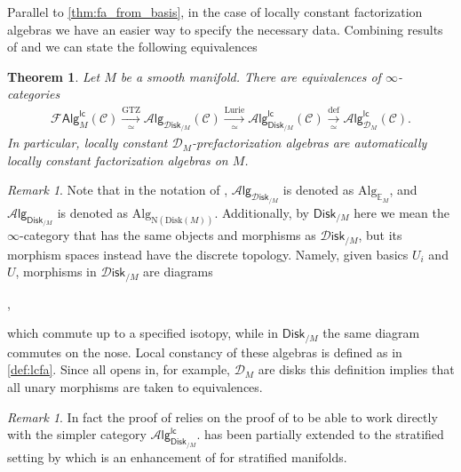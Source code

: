 \documentclass[12pt,a4paper]{article}
\newcounter{counter} \numberwithin{counter}{section}
\theoremstyle{definition}
\theoremstyle{plain}
\newtheorem{theorem}[counter]{Theorem}
\theoremstyle{remark}
\newtheorem{remark}[counter]{Remark}
\newcommand{\catC}{\mathscr{C}}
\newcommand{\lcfa}{\mathscr{F} \mathsf{Alg}^{\mathsf{lc}}}
\newcommand{\disk}{\mathscr{D} \mathsf{isk}}
\newcommand{\alg}[1]{\mathscr{A} \mathsf{lg}_{#1}}
\newcommand{\lcalg}[1]{\mathscr{A} \mathsf{lg}^{\mathsf{lc}}_{#1}}
\begin{document}
Parallel to \cref{thm:fa_from_basis}, in the case of locally constant factorization algebras we have an easier way to specify the necessary data. Combining results of \cite[thm.6]{gtz2014} and \cite[thm.5.4.5.9]{lurie_ha} we can state the following equivalences
%
\begin{theorem}\label{thm:smooth_lcfa_equivalences}
    Let $M$ be a smooth manifold. There are equivalences of $\infty$-categories
    \begin{align}
        \lcfa_M (\catC) \xrightarrow[\simeq]{\mathrm{GTZ}} \alg{\disk_{/M}} (\catC) \xrightarrow[\simeq]{\mathrm{Lurie}} \lcalg{\mathsf{Disk}_{/M}} (\catC) \xrightarrow[\simeq]{\mathrm{def}} \lcalg{\mathscr{D}_M} (\catC).
    \end{align}
    In particular, locally constant $\mathscr{D}_M$-prefactorization algebras are automatically locally constant factorization algebras on $M$.
\end{theorem}

\begin{remark}
    Note that in the notation of \cite{lurie_ha}, $\alg{\disk_{/M}}$ is denoted as $\mathrm{Alg}_{\mathbb{E}_M}$, and $\alg{\mathsf{Disk}_{/M}}$ is denoted as $\mathrm{Alg}_{\mathrm{N}(\mathrm{Disk}(M))}$. Additionally, by $\mathsf{Disk}_{/M}$ here we mean the $\infty$-category that has the same objects and morphisms as $\disk_{/M}$, but its morphism spaces instead have the discrete topology. Namely, given basics $U_i$ and $U$, morphisms in $\disk_{/M}$ are diagrams
    \begin{center}
        ,
    \end{center}
    which commute up to a specified isotopy, while in $\mathsf{Disk}_{/M}$ the same diagram commutes on the nose. Local constancy of these algebras is defined as in \cref{def:lcfa}. Since all opens in, for example, $\mathscr{D}_M$ are disks this definition implies that all unary morphisms are taken to equivalences.
\end{remark}

\begin{remark}
    In fact the proof of \cite[thm.6]{gtz2014} relies on the proof of \cite[thm.5.4.5.9]{lurie_ha} to be able to work directly with the simpler category $\lcalg{\mathsf{Disk}_{/M}}$.  has been partially extended to the stratified setting by \cite[prop.2.22]{aft_fhstrat} which is an enhancement of \cite[thm.5.4.5.9]{lurie_ha} for stratified manifolds.
\end{remark}
\end{document}
